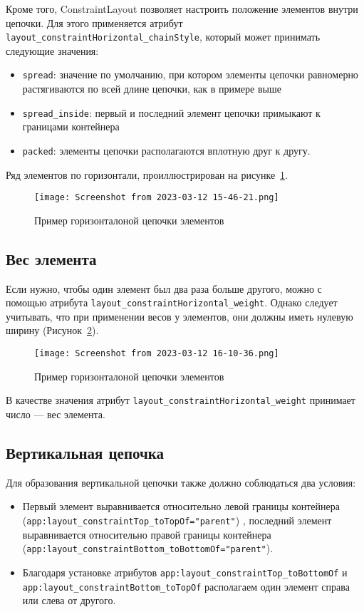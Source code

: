 Кроме того, ConstraintLayout позволяет настроить положение элементов
внутри цепочки. Для этого применяется атрибут
\texttt{layout\_constraintHorizontal\_chainStyle},
который может принимать следующие значения:
\label{tag:chain:style}
\begin{itemize}
	\item \texttt{spread}: значение по умолчанию, при котором элементы цепочки
		равномерно растягиваются по всей длине цепочки, как в примере выше
	\item \texttt{spread\_inside}: первый и последний элемент цепочки
		примыкают к границами контейнера
	\item \texttt{packed}: элементы цепочки располагаются вплотную
		друг к другу.
\end{itemize}

Ряд элементов по горизонтали, проиллюстрирован на
рисунке~\ref{fig:xml:chain:horizontal}.

\begin{figure}[h!tp]
	\centering
	\texttt{[image: Screenshot from 2023-03-12 15-46-21.png]}
	\caption{Пример горизонталоной цепочки элементов}
	\label{fig:xml:chain:horizontal}
\end{figure}

\subsection{Вес элемента}
Если нужно, чтобы один элемент был два раза больше другого, можно с
помощью атрибута \texttt{layout\_constraintHorizontal\_weight}. Однако следует
учитывать, что при применении весов у элементов, они должны иметь
нулевую ширину (Рисунок~\ref{fig:xml:chain:horizontal:weight}).

\begin{figure}[h!tp]
	\centering
	\texttt{[image: Screenshot from 2023-03-12 16-10-36.png]}
	\caption{Пример горизонталоной цепочки элементов}
	\label{fig:xml:chain:horizontal:weight}
\end{figure}

В качестве значения атрибут \texttt{layout\_constraintHorizontal\_weight}
принимает число --- вес элемента.

\subsection{Вертикальная цепочка}
Для образования вертикальной цепочки также должно соблюдаться два
условия:
\begin{itemize}
	\item Первый элемент выравнивается относительно левой границы
		контейнера (\texttt{app:layout\_constraintTop\_toTopOf="parent"})
		, последний
		элемент выравнивается относительно правой границы контейнера
		(\texttt{app:layout\_constraintBottom\_toBottomOf="parent"}).
	\item Благодаря установке атрибутов
		\texttt{app:layout\_constraintTop\_toBottomOf} и
		\texttt{app:layout\_constraintBottom\_toTopOf}
		располагаем один элемент справа или слева от другого.
\end{itemize}

